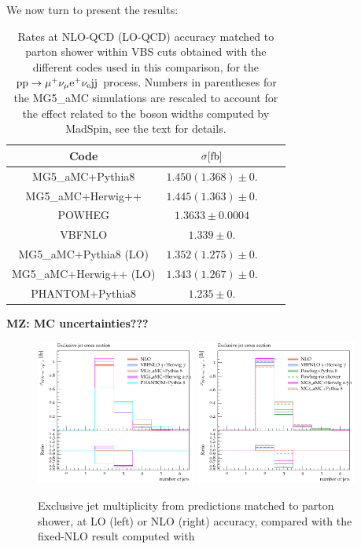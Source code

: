 We now turn to present the results:



\begin{table}[h!]
    \centering
    \begin{tabular}{c|c|c|c}
        Code  &  $\sigma[\rm{fb}]$  \\
        \hline
        {\sc MG5\_aMC}+{\sc Pythia8}&  $1.450 (1.368) \pm 0.$  \\
        {\sc MG5\_aMC}+{\sc Herwig++}&  $1.445 (1.363) \pm 0.$  \\
        {\sc POWHEG}  &  $1.3633 \pm 0.0004$  \\
        {\sc VBFNLO}  &  $1.339 \pm 0.$  \\
        \hline
        {\sc MG5\_aMC}+{\sc Pythia8} (LO)&  $1.352 (1.275) \pm 0.$  \\
        {\sc MG5\_aMC}+{\sc Herwig++} (LO)&  $1.343 (1.267)  \pm 0.$  \\
        {\sc PHANTOM}+{\sc Pythia8} &  $1.235  \pm 0.$  \\
    \end{tabular}
    \caption{\label{tab:wg1_NLOrates} Rates at NLO-QCD (LO-QCD) accuracy matched to parton shower within VBS cuts obtained with the different codes used in this comparison,
    for the ${\rm p}{\rm p}\to\mu^+\nu_\mu{\rm e}^+\nu_{\rm e}{\rm j}{\rm j}$ process. Numbers in parentheses for the {\sc MG5\_aMC} simulations
    are rescaled to account for the effect related to the boson widths computed by {\sc MadSpin}, see the text for details.}
{\bf MZ: MC uncertainties???}
\end{table}

\begin{figure}[hbt]
\centering
\includegraphics[width=0.47\textwidth]{figures/LOPS/jetsexclusive.pdf}
\includegraphics[width=0.47\textwidth]{figures/NLOPS/jetsexclusive.pdf}
\caption{Exclusive jet multiplicity from predictions matched to parton shower, at LO (left) or NLO (right) accuracy, compared with the fixed-NLO result
    computed with }
\label{fig:PSnjet}
\end{figure}

